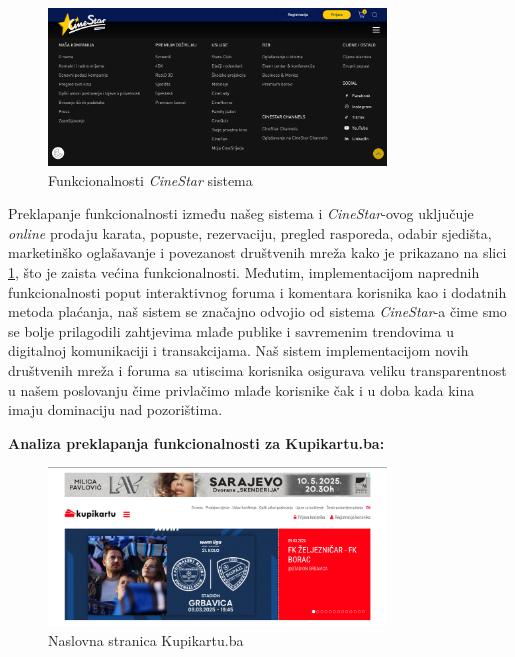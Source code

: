 \begin{figure}[!htb]
    \centering
    \includegraphics[width=0.8\textwidth]{Slike/cinestar2.png}
    \caption{Funkcionalnosti \textit{CineStar} sistema}
    \label{fig:cs2}
\end{figure}
Preklapanje funkcionalnosti između našeg sistema i \textit{CineStar}-ovog uključuje \textit{online} prodaju karata, popuste, rezervaciju, pregled rasporeda, odabir sjedišta, marketinško oglašavanje i povezanost društvenih mreža kako je prikazano na slici \ref{fig:cs2}, što je zaista većina funkcionalnosti. Međutim, implementacijom naprednih funkcionalnosti poput interaktivnog foruma i komentara korisnika kao i dodatnih metoda plaćanja, naš sistem se značajno odvojio od sistema \textit{CineStar}-a čime smo se bolje prilagodili zahtjevima mlađe publike i savremenim trendovima u digitalnoj komunikaciji i transakcijama. Naš sistem implementacijom novih društvenih mreža i foruma sa utiscima korisnika osigurava veliku transparentnost u našem poslovanju čime privlačimo mlađe korisnike čak i u doba kada kina imaju dominaciju nad pozorištima.
\sloppy 

\newpage

\noindent\textbf{Analiza preklapanja funkcionalnosti za Kupikartu.ba:}
\begin{figure}[!htbp]
    \centering
    \includegraphics[width=0.8\textwidth]{Slike/kupikartu1.png}
    \caption{Naslovna stranica Kupikartu.ba}
    \label{fig:kk1}
\end{figure}

